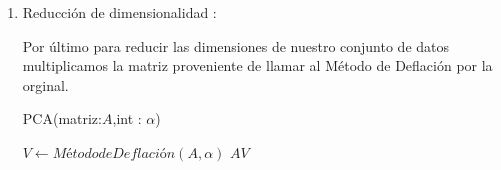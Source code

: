 \begin{enumerate}
\item Reducción de dimensionalidad :

Por último para reducir las dimensiones de nuestro conjunto de datos multiplicamos la matriz proveniente de llamar al Método de Deflación por la orginal.
\begin{algorithm}
\caption{PCA(matriz:$A$,int : $\alpha$)}
\begin{algorithmic}[1]
    \State $V  \leftarrow Método de Deflación(A,\alpha)$
    \State
    \Return  $A V$
\end{algorithmic}
\end{algorithm}

 \end{enumerate}




